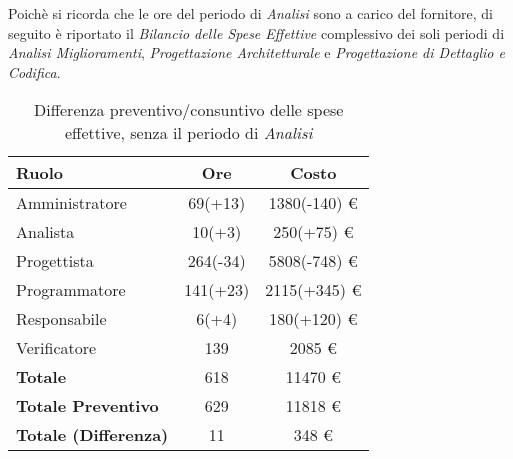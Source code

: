 Poich\`e si ricorda che le ore del periodo di \textit{Analisi} sono a carico del fornitore, di seguito \`e riportato il \textit{Bilancio delle Spese Effettive} complessivo dei soli periodi di \textit{Analisi Miglioramenti}, \textit{Progettazione Architetturale} e \textit{Progettazione di Dettaglio e Codifica}.

\begin{table}[H]
	\centering
	\begin{tabular}{ l c c }
		\textbf{Ruolo} & \textbf{Ore} & \textbf{Costo} \\
		\hline
		Amministratore & 69(+13) & 1380(-140) \euro{} \\
		Analista & 10(+3) & 250(+75) \euro{} \\
		Progettista & 264(-34) & 5808(-748) \euro{} \\
		Programmatore & 141(+23) & 2115(+345) \euro{} \\
		Responsabile & 6(+4) & 180(+120) \euro{} \\
		Verificatore & 139 & 2085 \euro{} \\
		\hline
		\textbf{Totale \glossaryItem{Consuntivo}} & 618 & 11470 \euro{} \\
		\hline
		\textbf{Totale Preventivo} & 629 & 11818 \euro{} \\
		\hline
		\textbf{Totale (Differenza)} & 11 & 348 \euro{} \\
		\hline
	\end{tabular}
	\caption{Differenza preventivo/consuntivo delle spese effettive, senza il periodo di \textit{Analisi}}
\end{table}

\newpage